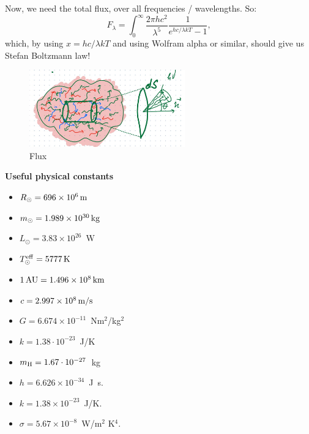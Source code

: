 \documentclass[12pt]{article}
\begin{document}
Now, we need the total flux, over all frequencies / wavelengths. So:
\begin{equation}
F_\lambda = \int_0^{\infty} \frac{2 \pi hc^2}{\lambda^5} \frac{1}{e^{hc/\lambda k T} - 1},
\end{equation}
which, by using $x = hc/\lambda k T$ and using Wolfram alpha or
similar, should give us Stefan Boltzmann law!

\begin{figure}
\includegraphics[width=0.6\textwidth]{flux.jpg}
\caption{Flux}
\end{figure}

 
{\bf Useful physical constants}
\begin{itemize}
  \item $R_{\odot} = 696 \times 10^6\,{\rm m}$
  \item $m_{\odot} = 1.989 \times 10^{30}\,{\rm kg}$
  \item $L_{\odot} = 3.83 \times 10^{26}$~W
  \item $T^{\rm eff}_{\odot} = 5777\,{\rm K}$
  \item $1\,{\rm AU} = 1.496 \times 10^8\,{\rm km}$
  \item $c = 2.997 \times 10^8\,{\rm m/s}$
  \item $G = 6.674 \times 10^{-11}$~Nm$^2$/kg$^2$
  \item $k = 1.38\cdot10^{-23}$~J/K
  \item $m_{\rm H} = 1.67\cdot10^{-27}$~kg
  \item $h=6.626 \times 10^{-34}$~J~s.
  \item $k=1.38 \times 10^{-23}$~J/K.
  \item $\sigma=5.67 \times 10^{-8}$~W/m$^2$ K$^4$.
\end{itemize}
\end{document}
